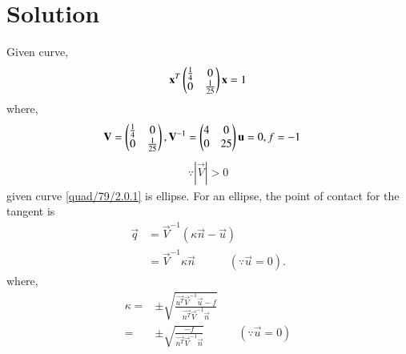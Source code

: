 \documentclass[journal,12pt,twocolumn]{IEEEtran}
\begin{document}
\section{Solution}
Given curve,
\begin{align}
\mathbf{x}^T\begin{pmatrix}\frac{1}{4} & 0 \\ 0 & \frac{1}{25}\end{pmatrix}\mathbf{x} = 1 \label{quad/79/2.0.1}
\end{align}
where,
\begin{align}
\mathbf{V}&=\begin{pmatrix}\frac{1}{4} & 0 \\ 0 & \frac{1}{25}\end{pmatrix},\mathbf{V}^{-1}=\begin{pmatrix}4&0\\0&25\end{pmatrix}\mathbf{u}=0, f = -1 
\end{align}
\begin{align}
\because |\vec{V}| > 0
\end{align}
given curve \eqref{quad/79/2.0.1} is ellipse.
For an ellipse, the point of contact for the tangent is
\begin{align}
\vec{q}&=\vec{V}^{-1}(\kappa\vec{n}-\vec{u})\\
&=\vec{V}^{-1}\kappa\vec{n}\quad\quad\quad(\because \vec{u}=0). \label{quad/79/2.0.5}
\end{align}
where,
\begin{align}
\kappa=&\pm \sqrt{\frac{\vec{u^T}\vec{V}^{-1}\vec{u}-f}{\vec{n^T}\vec{V}^{-1}\vec{n}}}\\
      =&\pm \sqrt{\frac{-f}{\vec{n^T}\vec{V}^{-1}\vec{n}}}\label{quad/79/2.0.7}\quad \quad\quad(\because \vec{u}=0)
\end{align}
\end{document}
